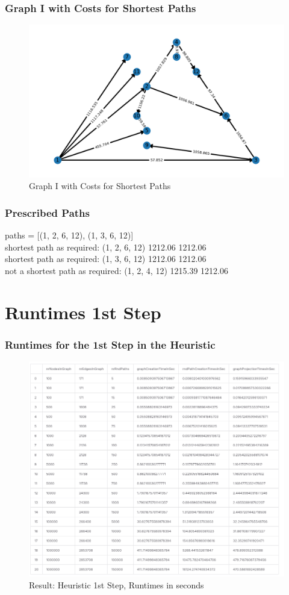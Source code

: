 \documentclass[
	11pt, %
]{beamer}
\begin{document}
\begin{frame}
	\frametitle{Graph I with Costs for Shortest Paths}
	
	\begin{figure}
		\includegraphics[width=0.8\linewidth]{graphI.png}
		\caption{Graph I with Costs for Shortest Paths}
	\end{figure}
\end{frame}

\begin{frame}
      \frametitle{Prescribed Paths}
paths =  [(1, 2, 6, 12), (1, 3, 6, 12)] \\


shortest path as required: (1, 2, 6, 12) 1212.06 1212.06 \\
shortest path as required: (1, 3, 6, 12) 1212.06 1212.06 \\
not a shortest path as required: (1, 2, 4, 12) 1215.39 1212.06      
\end{frame}      

\section{Runtimes 1st Step}
\begin{frame}
    \frametitle{Runtimes for the 1st Step in the Heuristic}
	\begin{figure}
		\includegraphics[width=0.6\linewidth]{ErgebnisHeuristik1Schritt.png}
		\caption{Result: Heuristic 1st Step, Runtimes in seconds}
	\end{figure}
    
\end{frame}
\end{document}
